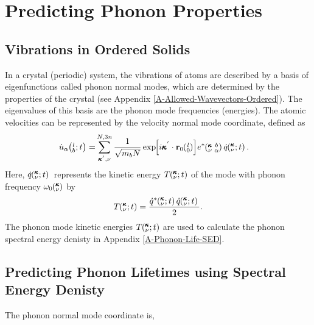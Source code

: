 \documentclass[letterpaper,12pt]{article}
\newcommand{\EXP}[1]{\exp\mspace{-5.0mu}\left[#1\right]\mspace{-3.0mu}}
\newcommand{\SUMprime}[2]{\ifthenelse{\equal{#1}{0}}{\sum_{\alpha_{#2},b_{#2},l_{#2}}^{3,n,N}} {\ifthenelse{\equal{#1}{1}}{\sum_{\alpha_{#2},b_{#2}}^{3,n}}{\sum_{\pmb{\kappa}^{'}#2,\nu#2}^{N,3n}}}}
\newcommand{\ab}[2]{\mspace{-4.0mu}\left(\mspace{-8.0mu}\begin{smallmatrix}&\ifthenelse{\equal{#1}{}}{a}{#1} \\&\ifthenelse{\equal{#2}{}}{b}{#2}\end{smallmatrix}\mspace{-3.0mu}\right)}
\newcommand{\kvba}{\mspace{-4.0mu}\left(\mspace{-8.0mu}\begin{smallmatrix} &\pmb{\kappa} &b \\ &\nu &\alpha\end{smallmatrix}\mspace{-3.0mu}\right)}
\newcommand{\kvt}{\mspace{-4.0mu}\left(\mspace{-8.0mu}\begin{smallmatrix}&\pmb{\kappa} \\&\nu\end{smallmatrix}\mspace{-2.0mu};t\right)}
\newcommand{\kv}{\mspace{-4.0mu}\left(\mspace{-8.0mu}\begin{smallmatrix}&\pmb{\kappa} \\&\nu\end{smallmatrix}\mspace{-3.0mu}\right)}
\newcommand{\lbt}{\mspace{-4.0mu}\left(\mspace{-8.0mu}\begin{smallmatrix}&l \\&b\end{smallmatrix}\mspace{-2.0mu};t\right)}
\begin{document}
\appendix

\section{\label{A-Predicting-Phonons}Predicting Phonon Properties}

\subsection{\label{A-Phonon-Normal-Modes}Vibrations in Ordered Solids}

In a crystal (periodic) system, the vibrations of atoms are described by a basis of eigenfunctions called phonon normal modes, which are determined by the properties of the crystal (see Appendix \ref{A-Allowed-Wavevectors-Ordered}). The eigenvalues of this basis are the phonon mode frequencies (energies).\cite{dove1993,wallace1972} The atomic velocities can be represented by the velocity normal mode coordinate, defined as 
\cite{dove1993}
\begin{equation}\label{E:udot_HLD}
\begin{split}
\dot{u}_{\alpha}\lbt = &\SUMprime{2}{} \frac{1}{\sqrt{m_bN}} \EXP{i\pmb{\kappa}^{'}\cdot\mathbf{r}_0\ab{l}{0}} e^*\kvba \dot{q}\kvt{}{}{}.
\end{split}
\end{equation}
Here, $\dot{q}\kvt{}{}{}$ represents the kinetic energy $T \kvt$ of the mode with phonon frequency $\omega_0\kv$ by
\cite{dove1993}
\begin{equation}\label{E:udot_HLD}
\begin{split}
T \kvt= \frac{\dot{q}^*\kvt{}{}{}\dot{q}\kvt{}{}{}}{2}.
\end{split}
\end{equation}
The phonon mode kinetic energies $T \kvt$ are used to calculate the phonon spectral energy denisty in Appendix \ref{A-Phonon-Life-SED}.

\subsection{\label{A-Phonon-Life-SED}Predicting Phonon Lifetimes using Spectral Energy Denisty}

The phonon normal mode coordinate is,
\end{document}
